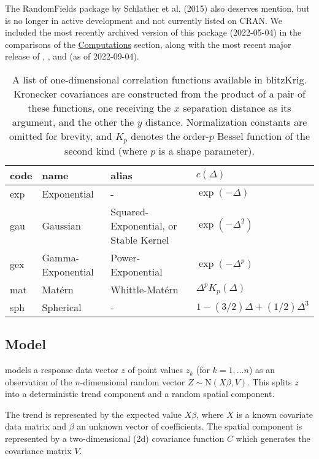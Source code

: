The RandomFields package by Schlather et al. (2015) also deserves mention, but is no longer in active development and not currently listed on CRAN. We included the most recently archived version of this package (2022-05-04) in the comparisons of the \protect\hyperlink{computations}{Computations} section, along with the most recent major release of , , and  (as of 2022-09-04).

\begin{table}

\caption{\label{tab:cfun-table-latex}A list of one-dimensional correlation functions available in blitzKrig. Kronecker covariances are constructed from the product of a pair of these functions, one receiving the $x$ separation distance as its argument, and the other the $y$ distance. Normalization constants are omitted for brevity, and $K_p$ denotes the order-$p$ Bessel function of the second kind (where $p$ is a shape parameter).}
\centering
\fontsize{9}{11}\selectfont
\begin{tabular}[t]{llll}
\toprule
code & name & alias & $c\left( \Delta \right)$\\
\midrule
exp & Exponential & - & $\exp\left( -\Delta \right)$\\
gau & Gaussian & Squared-Exponential, or Stable Kernel & $\exp\left( -\Delta^2 \right)$\\
gex & Gamma-Exponential & Power-Exponential & $\exp\left( -\Delta^p \right)$\\
mat & Mat\'ern & Whittle-Mat\'ern & $\Delta^p K_p\left( \Delta \right)$\\
sph & Spherical & - & $1 - (3/2)\Delta + (1/2)\Delta^3$\\
\bottomrule
\end{tabular}
\end{table}

\hypertarget{model}{%
\subsection{Model}\label{model}}

 models a response data vector \(z\) of point values \(z_k\) (for \(k=1,\dots n\)) as an observation of the \(n\)-dimensional random vector \(Z \sim \text{N} \left( X\beta, V \right)\). This splits \(z\) into a deterministic trend component and a random spatial component.

The trend is represented by the expected value \(X\beta\), where \(X\) is a known covariate data matrix and \(\beta\) an unknown vector of coefficients. The spatial component is represented by a two-dimensional (2d) covariance function \(C\) which generates the covariance matrix \(V\).

